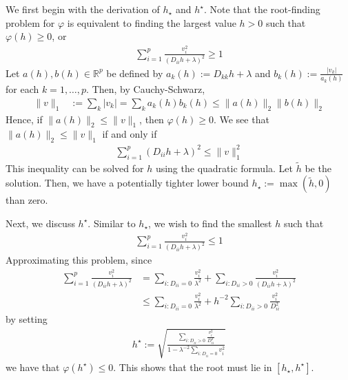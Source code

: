 \documentclass[fontsize=11pt]{article}
\newcommand{\R}{\mathbb{R}}
\newcommand{\norm}[1]{\|#1\|}
\newcommand{\abs}[1]{\left|#1\right|}
\begin{document}
We first begin with the derivation of $h_\star$ and $h^\star$.
Note that the root-finding problem for $\varphi$
is equivalent to finding the largest value $h > 0$ such that $\varphi(h) \geq 0$, or
\begin{align*}
    \sum\limits_{i=1}^p
    \frac{v_i^2}{(D_{ii} h + \lambda)^2}
    \geq
    1
\end{align*}
Let $a(h), b(h) \in \R^p$ be defined by $a_k(h) := D_{kk} h + \lambda$
and $b_k(h) := \frac{\abs{v_k}}{a_k(h)}$ for each $k=1,\ldots, p$.
Then, by Cauchy-Schwarz,
\begin{align*}
    \norm{v}_1
    &:=
    \sum\limits_{k} \abs{v_k}
    =
    \sum\limits_{k} a_k(h) b_k(h)
    \leq
    \norm{a(h)}_{2} \norm{b(h)}_2
\end{align*}
Hence, if $\norm{a(h)}_2 \leq \norm{v}_1$,
then $\varphi(h) \geq 0$.
We see that $\norm{a(h)}_2 \leq \norm{v}_1$ if and only if
\begin{align*}
    \sum\limits_{i=1}^p
    (D_{ii} h + \lambda)^2
    \leq
    \norm{v}_1^2
\end{align*}
This inequality can be solved for $h$ using the quadratic formula.
Let $\tilde{h}$ be the solution.
Then, we have a potentially tighter lower bound $h_\star := \max(\tilde{h}, 0)$ than zero.

Next, we discuss $h^\star$.
Similar to $h_\star$, we wish to find the smallest $h$ such that
\begin{align*}
    \sum\limits_{i=1}^p
    \frac{v_i^2}{(D_{ii} h + \lambda)^2}
    \leq
    1
\end{align*}
Approximating this problem, since
\begin{align}
    \sum\limits_{i=1}^p
    \frac{v_i^2}{(D_{ii} h + \lambda)^2}
    &=
    \sum\limits_{i: D_{ii} = 0}
    \frac{v_i^2}{\lambda^2}
    +
    \sum\limits_{i: D_{ii} > 0}
    \frac{v_i^2}{(D_{ii} h + \lambda)^2}
    \nonumber\\&\leq 
    \sum\limits_{i: D_{ii} = 0}
    \frac{v_i^2}{\lambda^2}
    +
    h^{-2}
    \sum\limits_{i: D_{ii} > 0}
    \frac{v_i^2}{D_{ii}^2 }
    \label{eq:nmab:upper-approx}
\end{align}
by setting 
\begin{align*}
    h^\star
    := 
    \sqrt{
        \frac{
            \sum\limits_{i: D_{ii} > 0} \frac{v_i^2}{D_{ii}^2}
        }{
            1 - \lambda^{-2} \sum\limits_{i : D_{ii} = 0} v_i^2
        }
    }
\end{align*}
we have that $\varphi(h^\star) \leq 0$.
This shows that the root must lie in $[h_\star, h^\star]$.
\end{document}
